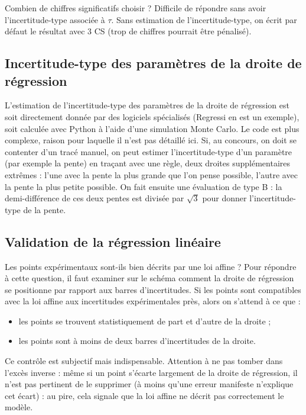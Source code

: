 \documentclass[10pt]{article}
\begin{document}
\begin{multicols}{2}
Combien de chiffres significatifs choisir ? Difficile de répondre sans avoir l’incertitude-type associée à $\tau$. Sans estimation de l’incertitude-type, on écrit par défaut le résultat avec 3 CS (trop de chiffres pourrait être pénalisé).

\subsection{Incertitude-type des paramètres de la droite de régression}

L’estimation de l’incertitude-type des paramètres de la droite de régression est soit directement donnée par des logiciels spécialisés (Regressi en est un exemple), soit calculée avec Python à l’aide d’une simulation Monte Carlo. Le code est plus complexe, raison pour laquelle il n’est pas détaillé ici. Si, au concours, on doit se contenter d’un tracé manuel, on peut estimer l’incertitude-type d’un paramètre (par exemple la pente) en traçant avec une règle, deux droites supplémentaires extrêmes : l’une avec la pente la plus grande que l’on pense possible, l’autre avec la pente la plus petite possible. On fait ensuite une évaluation de type B : la demi-différence de ces deux pentes est divisée par $\sqrt{3}$ pour donner l’incertitude-type de la pente.

\subsection{Validation de la régression linéaire}

Les points expérimentaux sont-ils bien décrits par une loi affine ? Pour répondre à cette question, il faut examiner sur le schéma comment la droite de régression se positionne par rapport aux barres d’incertitudes. Si les points sont compatibles avec la loi affine aux incertitudes expérimentales près, alors on s’attend à ce que :
\begin{itemize}
    \item les points se trouvent statistiquement de part et d’autre de la droite ;
    \item les points sont à moins de deux barres d’incertitudes de la droite.
\end{itemize}
Ce contrôle est subjectif mais indispensable. Attention à ne pas tomber dans l’excès inverse : même si un point s’écarte largement de la droite de régression, il n’est pas pertinent de le supprimer (à moins qu’une erreur manifeste n’explique cet écart) : au pire, cela signale que la loi affine ne décrit pas correctement le modèle.





\end{multicols}
\end{document}
